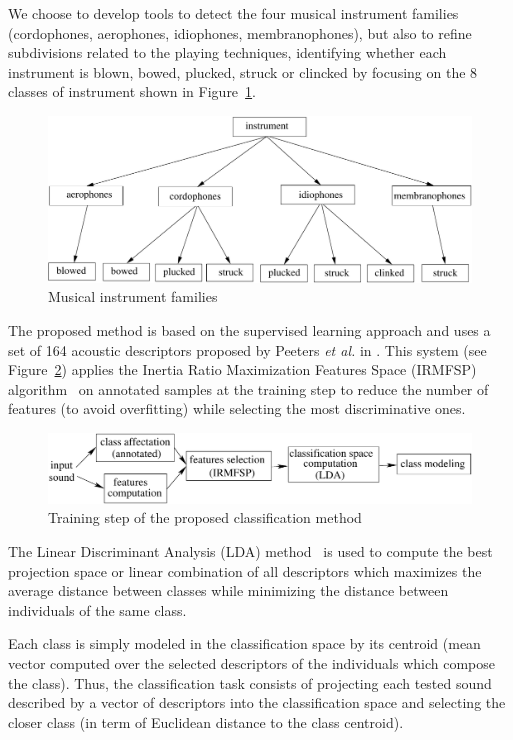 \documentclass{sig-alternate}
\begin{document}
We choose to develop tools to detect the four musical instrument families (cordophones, aerophones, idiophones, membranophones), but also to refine subdivisions related to the playing techniques, identifying whether each instrument is blown, bowed, plucked, struck or clincked by focusing on the 8 classes of instrument shown in Figure~\ref{fig:instruments}.

\begin{figure}[htb]
  \centering
  \includegraphics[width=0.9\linewidth]{img/taxonomie_diadems.pdf}
  \caption{Musical instrument families}
  \label{fig:instruments}
\end{figure}

The proposed method is based on the supervised learning approach and uses a set of 164 acoustic descriptors 
proposed by Peeters \textit{et al.} in \cite{timbre_toolbox}.
This system (see Figure~\ref{fig:inst_classif_method}) applies the Inertia Ratio Maximization Features Space (IRMFSP) algorithm~\cite{aes_irmfsp} 
on annotated samples at the training step to reduce the number of features (to avoid overfitting) while selecting the most discriminative ones. %

\begin{figure}[htb]
 \centering
 \includegraphics[width=0.9\linewidth]{img/method}
 \caption{Training step of the proposed classification method}
 \label{fig:inst_classif_method}
\end{figure}

The Linear Discriminant Analysis (LDA) method~\cite{lda_book} is used to compute the best projection space 
or linear combination of all descriptors which maximizes the average distance between classes while minimizing the 
distance between individuals of the same class.

Each class is simply modeled in the classification space by its centroid (mean vector computed over the selected descriptors of the individuals which compose the class).
Thus, the classification task consists of projecting each tested sound described by a vector of descriptors
into the classification space and selecting the closer class (in term of Euclidean distance to the class centroid). 
\end{document}
